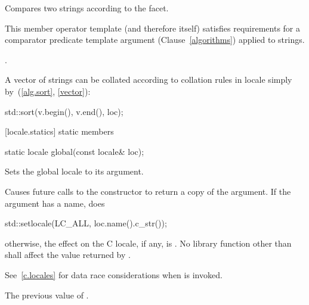 \begin{itemdescr}
\pnum
\effects
Compares two strings according to the
facet.

\pnum
\remarks
This member operator template (and therefore
itself) satisfies requirements for a comparator predicate template argument
(Clause~\ref{algorithms}) applied to strings.

\pnum
\returns
{}.

\pnum
\begin{example}
A vector of strings
can be collated according to collation rules in locale
simply by~(\ref{alg.sort}, \ref{vector}):

\begin{codeblock}
std::sort(v.begin(), v.end(), loc);
\end{codeblock}
\end{example}
\end{itemdescr}

[locale.statics]{ static members}

%
\begin{itemdecl}
static locale global(const locale& loc);
\end{itemdecl}

\begin{itemdescr}
\pnum
Sets the global locale to its argument.

\pnum
\effects
Causes future calls to the constructor
to return a copy of the argument.
If the argument has a name, does

\begin{codeblock}
std::setlocale(LC_ALL, loc.name().c_str());
\end{codeblock}

otherwise, the effect on the C locale, if any, is .
No library function other than
shall affect the value returned by
.
\begin{note} See~\ref{c.locales} for data race considerations when
 is invoked. \end{note}

\pnum
\returns
The previous value of
.
\end{itemdescr}

